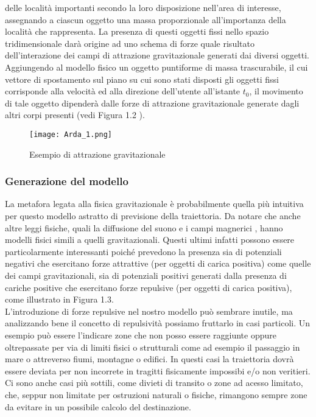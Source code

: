 delle localit\`a importanti secondo la loro disposizione nell'area di interesse,
assegnando a ciascun oggetto una massa proporzionale all'importanza della
localit\`a che rappresenta. La presenza di questi oggetti fissi nello spazio tridimensionale
dar\`a origine ad uno schema di forze quale risultato dell'interazione
dei campi di attrazione gravitazionale generati dai diversi oggetti. Aggiungendo
al modello fisico un oggetto puntiforme di massa trascurabile, il cui vettore
di spostamento sul piano su cui sono stati disposti gli oggetti fissi corrisponde
alla velocit\`a ed alla direzione dell'utente all'istante $t_{0}$, il movimento di tale
oggetto dipender\`a dalle forze di attrazione gravitazionale generate dagli altri
corpi presenti (vedi Figura 1.2 ).
\begin{figure}
    \begin{center}
    \texttt{[image: Arda\_1.png]}
    \caption[Arda 1]{Esempio di attrazione gravitazionale}
    \label{etichetta}
    \end{center}
\end{figure}

\subsubsection{Generazione del modello}
La metafora legata alla fisica gravitazionale \`e probabilmente quella pi\`u intuitiva
per questo modello astratto di previsione della traiettoria.
Da notare che anche altre leggi fisiche, quali la diffusione del suono e i campi magnerici ,
hanno modelli fisici simili a quelli gravitazionali. Questi ultimi infatti possono essere
particolarmente interessanti poich\'e prevedono la presenza sia di potenziali negativi
che esercitano forze attrattive (per oggetti di carica positiva) come quelle dei
campi gravitazionali, sia di potenziali positivi generati dalla presenza di cariche
positive che esercitano forze repulsive (per oggetti di carica positiva), come
illustrato in Figura 1.3.\\
L'introduzione di forze repulsive nel nostro modello pu\`o sembrare inutile, ma analizzando
bene il concetto di repulsivit\`a possiamo fruttarlo in casi particoli. Un esempio pu\`o
essere l'indicare zone che non posso essere raggiunte oppure oltrepassate per via di limiti
fisici o strutturali come ad esempio il passaggio in mare o attreverso fiumi, montagne o edifici.
In questi casi la traiettoria dovr\`a essere deviata per non incorrete in tragitti fisicamente
impossibi e/o non veritieri. Ci sono anche casi pi\`u sottili, come divieti di transito o
zone ad acesso limitato, che, seppur non limitate per ostruzioni naturali o fisiche, rimangono
sempre zone da evitare in un possibile calcolo del destinazione.

